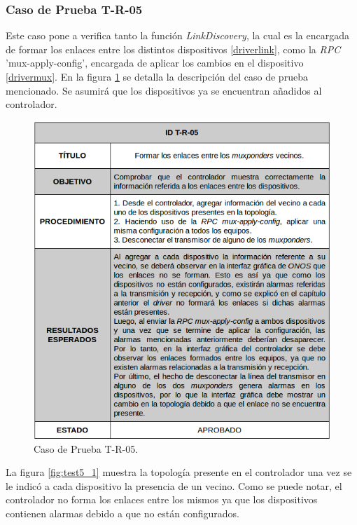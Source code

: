   \subsubsection{Caso de Prueba T-R-05}

  Este caso pone a verifica tanto la función \textit{LinkDiscovery}, la cual es la encargada de formar los enlaces entre los distintos dispositivos \ref{driverlink}, como la  \textit{RPC} 'mux-apply-config', encargada de aplicar los cambios en el dispositivo \ref{drivermux}. 
  En la figura \ref{fig:test5} se detalla la descripción del caso de prueba mencionado. Se asumirá que los dispositivos ya se encuentran añadidos al controlador.
  

\begin{figure}[H]
	\centering
	\includegraphics[scale=0.6]{Figures/test5.png}
	\caption{Caso de Prueba T-R-05.}
	\label{fig:test5}
  \end{figure}

  La figura \ref{fig:test5_1} muestra la topología presente en el controlador una vez se le indicó a cada dispositivo la presencia de un vecino. Como se puede notar, el controlador no forma los enlaces entre los mismos ya que los dispositivos contienen alarmas debido a que no están configurados. 

